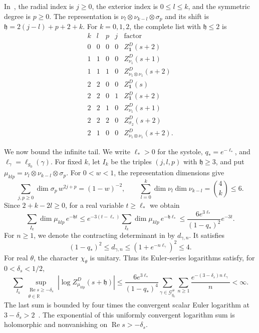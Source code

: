 \documentclass[11pt,letterpaper,reqno]{amsart}
\theoremstyle{remark}
\begin{document}
\begin{samepage}
In~\cite[(7.6)]{DGRS}, the radial index is $j\ge0$, the exterior index
is $0\le l\le k$, and the symmetric degree is $p\ge0$.
The representation is $\nu_l\otimes\nu_{k-l}\otimes\sigma_p$
and its shift is $\mathfrak h=2(j-l)+p+2+k$.
For $k=0,1,2$, the complete list with $\mathfrak h\le2$ is
\[
\begin{array}{ccccl}
 k&l&p&j&\text{factor}\\\hline
 0&0&0&0&Z^D_{\mathbf1}(s+2)\\
 1&1&0&0&Z^D_{\nu_1}(s+1)\\
 1&1&1&0&Z^D_{\nu_1\otimes\nu_1}(s+2)\\
 2&2&0&0&Z^D_{\mathbf1}(s)\\
 2&2&0&1&Z^D_{\mathbf1}(s+2)\\
 2&2&1&0&Z^D_{\nu_1}(s+1)\\
 2&2&2&0&Z^D_{\sigma_2}(s+2)\\
 2&1&0&0&Z^D_{\nu_1\otimes\nu_1}(s+2).
\end{array}
\]
\end{samepage}
We now bound the infinite tail. We write $\ell_*>0$ for the systole,
$q_*=e^{-\ell_*}$, and $\ell_\gamma=\ell_{g_0}(\gamma)$.
For fixed $k$, let $I_k$ be the triples $(j,l,p)$ with $\mathfrak h\ge3$, and put
$\mu_{klp}=\nu_l\otimes\nu_{k-l}\otimes\sigma_p$.
For $0<w<1$, the representation dimensions give
\[
 \sum_{j,p\ge0}\dim\sigma_p\,w^{2j+p}=(1-w)^{-2},
 \qquad\sum_{l=0}^k\dim\nu_l\dim\nu_{k-l}=\binom4k\le6.
\]
Since $2+k-2l\ge0$, for a real variable $t\ge\ell_*$ we obtain
\[
 \sum_{I_k}\dim\mu_{klp}\,e^{-\mathfrak h t}
 \le e^{-3(t-\ell_*)}\sum_{I_k}\dim\mu_{klp}\,e^{-\mathfrak h\ell_*}
 \le\frac{6e^{3\ell_*}}{(1-q_*)^2}e^{-3t}.
\]
For $n\ge1$, we denote the contracting determinant in
\cite[(7.5)]{DGRS} by $d_{\gamma,n}$. It satisfies
\[
 (1-q_*)^2\le d_{\gamma,n}\le(1+e^{-n\ell_\gamma})^2\le4.
\]
For real $\theta$, the character $\chi_\theta$ is unitary.
Thus its Euler-series logarithms satisfy, for $0<\delta_s<1/2$,
\[
 \sum_{I_k}\sup_{\substack{\operatorname{Re}s\ge-\delta_s\\\theta\in\mathbb R}}
 |\log Z^D_{\mu_{klp}}(s+\mathfrak h)|
 \le\frac{6e^{3\ell_*}}{(1-q_*)^4}
 \sum_{\gamma\in\mathcal G_{g_0}^\#}\sum_{n\ge1}
 \frac{e^{-(3-\delta_s)n\ell_\gamma}}{n}<\infty.
\]
The last sum is bounded by four times the convergent scalar Euler
logarithm at $3-\delta_s>2$~\cite[Section~7.3]{DGRS}.
The exponential of this uniformly convergent logarithm sum is holomorphic
and nonvanishing on $\operatorname{Re}s>-\delta_s$.
\end{document}
